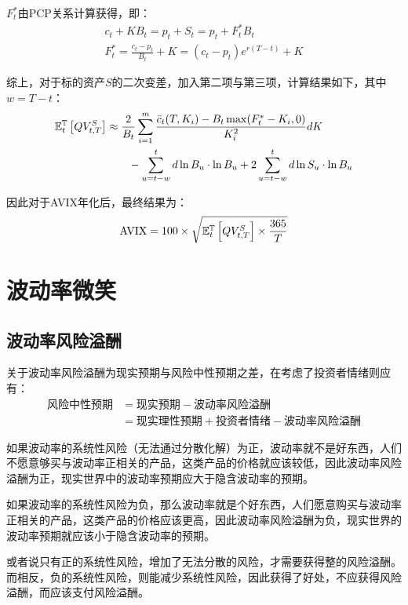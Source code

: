 \documentclass[11pt]{article}
\begin{document}
$F_{t}^{*}$由PCP关系计算获得，即：
\begin{gather*}
    c_t + KB_t = p_t + S_t = p_t + F_{t}^{*} B_t \\
    F_{t}^{*} = \frac{c_t - p_t}{B_t} + K = (c_t - p_t) e^{r(T-t)} + K
\end{gather*}

综上，对于标的资产$S$的二次变差，加入第二项与第三项，计算结果如下，其中$w=T-t$：
\begin{align*}
    \mathbb{E}_{t}^{\mathbb{T}}\left[ QV_{t,T}^{S} \right] &\approx
    \frac{2}{B_t} \sum_{i=1}^{m} \frac{\bar{c}_t(T,K_i) - B_t \max(F_{t}^{*} - K_i,0)}{K_i^2} dK \\
    &\qquad - \sum_{u=t-w}^{t}d\ln B_u \cdot \ln B_u + 2 \sum_{u=t-w}^{t}d\ln S_u \cdot \ln B_u
\end{align*}

因此对于AVIX年化后，最终结果为：
\begin{equation*}
    \text{AVIX} = 100 \times \sqrt{\mathbb{E}_{t}^{\mathbb{T}}\left[ QV_{t,T}^{S} \right] \times \frac{365}{T}}
\end{equation*}

\section{波动率微笑}

\subsection{波动率风险溢酬}

关于波动率风险溢酬为现实预期与风险中性预期之差，在考虑了投资者情绪则应有：
\begin{align*}
    \text{风险中性预期} &= \text{现实预期} - \text{波动率风险溢酬} \\
    &= \text{现实理性预期} + \text{投资者情绪} - \text{波动率风险溢酬}
\end{align*}

如果波动率的系统性风险（无法通过分散化解）为正，波动率就不是好东西，人们不愿意够买与波动率正相关的产品，这类产品的价格就应该较低，因此波动率风险溢酬为正，现实世界中的波动率预期应大于隐含波动率的预期。

如果波动率的系统性风险为负，那么波动率就是个好东西，人们愿意购买与波动率正相关的产品，这类产品的价格应该更高，因此波动率风险溢酬为负，现实世界的波动率预期就应该小于隐含波动率的预期。

或者说只有正的系统性风险，增加了无法分散的风险，才需要获得整的风险溢酬。而相反，负的系统性风险，则能减少系统性风险，因此获得了好处，不应获得风险溢酬，而应该支付风险溢酬。
\end{document}
